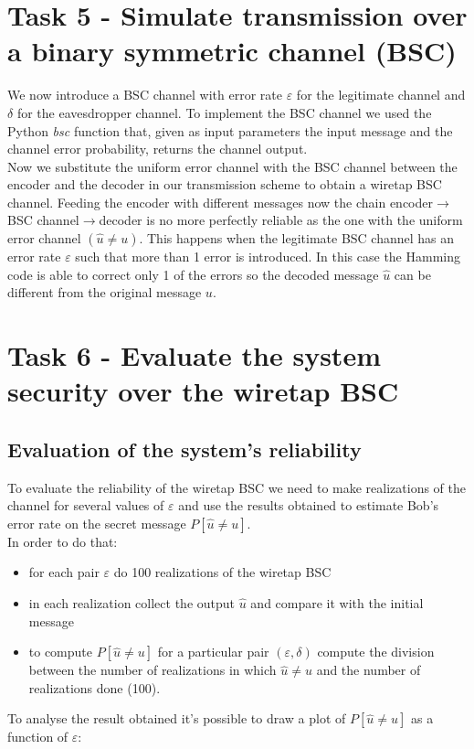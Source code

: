 \documentclass{report}
\begin{document}
\section*{Task 5 - Simulate transmission over a binary symmetric channel (BSC)}
We now introduce a BSC channel with error rate $\varepsilon$ for the legitimate channel and $\delta$ for the  eavesdropper channel. To implement the BSC channel we used the Python \textit{bsc} function that, given as input parameters the input message and the channel error probability, returns the channel output.\\
Now we substitute the uniform error channel with the BSC channel between the encoder and the decoder in our transmission scheme to obtain a wiretap BSC channel. Feeding the encoder with different messages now the chain encoder$\to$BSC channel$\to$decoder is no more perfectly reliable as the one with the uniform error channel $(\hat{u}\neq u)$. This happens when the legitimate BSC channel has an error rate $\varepsilon$ such that more than 1 error is introduced. In this case the Hamming code is  able to correct only 1 of the errors so the decoded message $\hat{u}$ can be different from the original message $u$. 




\section*{Task 6 - Evaluate the system security over the wiretap BSC}
\subsection*{Evaluation of the system’s reliability}
To evaluate the reliability of the wiretap BSC we need to make realizations of the channel for several values of $\varepsilon$ and use the results obtained to estimate Bob’s error rate on the secret message $P[\hat{u} \neq u]$.\\
In order to do that: 
\begin{itemize}
\item for each pair $\varepsilon$ do 100 realizations of the wiretap BSC
\item in each realization collect the output $\hat{u}$ and compare it with the initial message
\item to compute $P[\hat{u}\neq u]$ for a particular pair $(\varepsilon, \delta)$ compute the division between the number of realizations in which $\hat{u}\neq u$ and the number of realizations done (100).
\end{itemize}
To analyse the result obtained it’s possible to draw a plot of $P[\hat{u}\neq u]$ as a function of $\varepsilon$:
\end{document}
